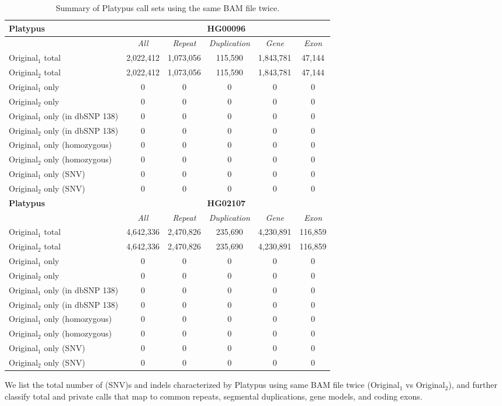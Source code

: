 \begin{table}[htb]
\caption{ Summary of Platypus call sets using the same BAM file twice. }
\begin{center}
\begin{tabular}{|l|c||c|c|c|c|}
\hline
{\bf Platypus} & \multicolumn{5}{|c|}{\bf HG00096} \\
\hline
\cline{2-6}
{\bf} & {\it All} & {\it Repeat} & {\it Duplication} & {\it Gene} & {\it Exon} \\
\hline
Original$_1$ total & 2,022,412 & 1,073,056 & 115,590 & 1,843,781 & 47,144 \\
\hline
Original$_2$ total & 2,022,412 & 1,073,056 & 115,590 & 1,843,781 & 47,144 \\
\hline
Original$_1$ only & 0 & 0 & 0 & 0 & 0\\ 
\hline
Original$_2$ only & 0 & 0 & 0 & 0 & 0\\ 
\hline
Original$_1$ only (in dbSNP 138) & 0 & 0 & 0 & 0 & 0\\ 
\hline
Original$_2$ only (in dbSNP 138) & 0 & 0 & 0 & 0 & 0\\ 
\hline
Original$_1$ only (homozygous) & 0 & 0 & 0 & 0 & 0\\ 
\hline
Original$_2$ only (homozygous) & 0 & 0 & 0 & 0 & 0\\ 
\hline
Original$_1$ only (SNV) & 0 & 0 & 0 & 0 & 0\\ 
\hline
Original$_2$ only (SNV) & 0 & 0 & 0 & 0 & 0\\ 
\hline
\hline
{\bf Platypus} & \multicolumn{5}{|c|}{\bf HG02107} \\
\hline
\cline{2-6}
{\bf} & {\it All} & {\it Repeat} & {\it Duplication} & {\it Gene} & {\it Exon} \\
\hline
Original$_1$ total & 4,642,336 & 2,470,826 & 235,690 & 4,230,891 & 116,859 \\
\hline
Original$_2$ total & 4,642,336 & 2,470,826 & 235,690 & 4,230,891 & 116,859 \\
\hline
Original$_1$ only & 0 & 0 & 0 & 0 & 0\\ 
\hline
Original$_2$ only & 0 & 0 & 0 & 0 & 0\\ 
\hline
Original$_1$ only (in dbSNP 138) & 0 & 0 & 0 & 0 & 0\\ 
\hline
Original$_2$ only (in dbSNP 138) & 0 & 0 & 0 & 0 & 0\\ 
\hline
Original$_1$ only (homozygous) & 0 & 0 & 0 & 0 & 0\\ 
\hline
Original$_2$ only (homozygous) & 0 & 0 & 0 & 0 & 0\\ 
\hline
Original$_1$ only (SNV) & 0 & 0 & 0 & 0 & 0\\ 
\hline
Original$_2$ only (SNV) & 0 & 0 & 0 & 0 & 0\\ 
\hline
\end{tabular}
\end{center}
{\footnotesize We list the total number of (SNV)s and indels characterized by Platypus using same BAM file twice (Original$_1$ vs Original$_2$), 
and further classify total and private calls that map to common repeats, segmental duplications, gene models, and coding exons.}
\label{supptab:orig-vs-orig2-platypus}
\end{table}

